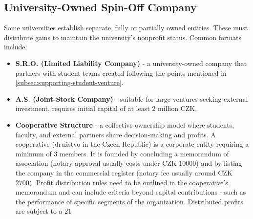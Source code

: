 \subsection{University-Owned Spin-Off Company}
Some universities establish separate, fully or partially owned entities. These must distribute gains to maintain the university’s nonprofit status. Common formats include:
\begin{itemize}
    \item \textbf{S.R.O. (Limited Liability Company)} - a university-owned company that partners with student teams created following the points mentioned in \ref{subsec:supporting-student-venture}.
    \item \textbf{A.S. (Joint-Stock Company)} - suitable for large ventures seeking external investment, requires initial capital of at least 2 million CZK.
    \item \textbf{Cooperative Structure }- a collective ownership model where students, faculty, and external partners share decision-making and profits. A cooperative (družstvo in the Czech Republic) is a corporate entity requiring a minimum of 3 members. It is founded by concluding a memorandum of association (notary approval usually costs under CZK 10000) and by listing the company in the commercial register (notary fee usually around CZK 2700). Profit distribution rules need to be outlined in the cooperative’s memorandum and can include criteria beyond capital contributions  - such as the performance of specific segments of the organization. Distributed profits are subject to a 21%
\end{itemize}
